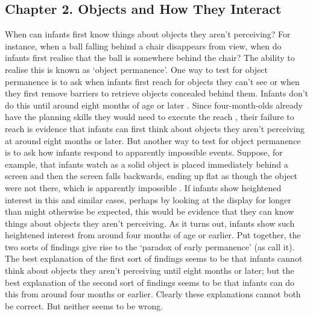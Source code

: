 \documentclass[12pt,\papersize]{extarticle}
\begin{document}
\subsection{Chapter 2. Objects and How They Interact}
\label{ch:objects}
When can infants first know things about objects they aren't perceiving?   
For instance, when a ball falling behind a chair disappears from view, when do infants first realise that the ball is somewhere behind the chair?
The ability to realise this is known as `object permanence'.  
One way to test for object permanence is to ask when infants first reach for objects they can’t see or when they first remove barriers to retrieve objects concealed behind them.  
Infants don’t do this until around eight months of age \citep[p.\ 202]{Meltzoff:1998wp} or  later \citep{moore:2008_factors}.  
Since four-month-olds already have the planning skills they would need to execute the reach \citep{Shinskey:2001fk}, 
their failure to reach is evidence that infants can first think about objects they aren’t perceiving at around eight months or later.  
But another way to test for object permanence is to ask how infants respond to apparently impossible events. 
Suppose, for example, that infants watch as a solid object is placed immediately behind a screen and then the screen falls backwards, ending up flat as though the object were not there, which is apparently impossible \citep{baillargeon:1985_object,baillargeon:1987_object}. 
If infants show heightened interest in this and similar cases, perhaps by looking at the display for longer than might otherwise be expected, this would be evidence that they can know things about objects they aren't perceiving.
 As it turns out, infants show such heightened interest from around four months of age or earlier. 
Put together, the two sorts of findings give rise to the `paradox of early permanence' (as \citealp{Meltzoff:1998wp} call it). 
The best explanation of the first sort of findings seems to be that infants cannot think about objects they aren't perceiving until eight months or later; 
but the best explanation of the second sort of findings seems to be that infants can do this from around four months or earlier. 
Clearly these explanations cannot both be correct. 
But neither seems to be wrong. 
\end{document}
